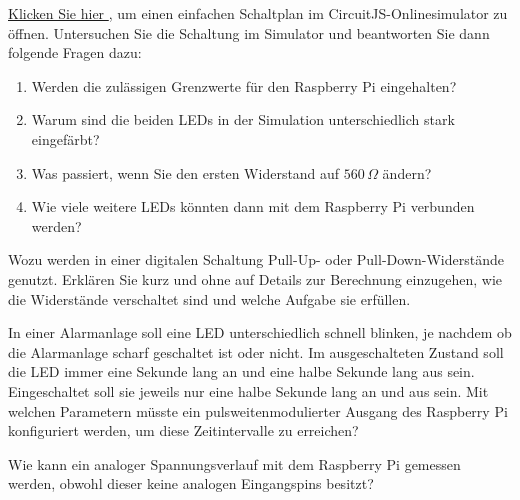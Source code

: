 \teilaufgabe
\textcolor{red}{
    \href{%
        https://www.falstad.com/circuit/circuitjs.html?ctz=CQAgjCAMB0l3BWcMBMcUHYMGZIA4UA2ATmIxAUgoqoQFMBaMMAKAHMRCUAWCsFTjwoo8UKCwBOnDAO7dRGQqLmiqYSizBcQi5fJB5ss-QIAmdAGYBDAK4AbAC4M7dU+DFUYkVgBlpx0S5eFTEIazsAZzoQbGhscT9CGRi8XiCU3jUQcKiYuPEpJIFsVJ0lDLE8MGJoUjr6+pZsDCpDYtLifgqITyaWgyMQEM6A916AdxARiumQyBZJ2f1phC75rQFdCraKs0tbR2dXMY9YVkWu1YF0q4T-GLRBXiNPdxzo2Pj5wuSXstE-moNJMtn8doC+q1Bn9pn8euILsVHrDSvMAEacBCEECYJDcDDEChY8QADyGigoeFo3GxCEMQ3AAgASlYIgAHNF0CQATwAOhEAAoASxYZMoAKECGIz0wDK6AHEBQBJADyDAAgjYImwrAA7NiimiiVZpSACVbkXhdACyrKi-IAFPKJAB7Gy60wASkNlHIJVpxHiJUJVoEitVGq1Ov1PsgltWFEDQwQwUZIHDas12r1BoxO0wAkDxoQ5HmZNStDwSE6leUafldAAtnQIlFdXRDYZCYRINjOt3ICG0wBlByuxsRBwAE4kAGs6LqWEA
    }{
        Klicken Sie hier%
    }%
}, um einen einfachen Schaltplan im CircuitJS-Onlinesimulator zu öffnen.
Untersuchen Sie die Schaltung im Simulator und beantworten Sie dann folgende Fragen
dazu:

\begin{enumerate}
    \item Werden die zulässigen Grenzwerte für den Raspberry Pi eingehalten?
    \item Warum sind die beiden LEDs in der Simulation unterschiedlich stark eingefärbt?
    \item Was passiert, wenn Sie den ersten Widerstand auf $560\,\Omega$ ändern?
    \item Wie viele weitere LEDs könnten dann mit dem Raspberry Pi verbunden werden?
\end{enumerate}

\bigskip
\teilaufgabe
Wozu werden in einer digitalen Schaltung Pull-Up- oder Pull-Down-Widerstände
genutzt. Erklären Sie kurz und ohne auf Details zur Berechnung einzugehen, wie
die Widerstände verschaltet sind und welche Aufgabe sie erfüllen.

\bigskip
\teilaufgabe
In einer Alarmanlage soll eine LED unterschiedlich schnell blinken, je nachdem
ob die Alarmanlage scharf geschaltet ist oder nicht. Im ausgeschalteten Zustand
soll die LED immer eine Sekunde lang an und eine halbe Sekunde lang aus sein.
Eingeschaltet soll sie jeweils nur eine halbe Sekunde lang an und aus sein.
Mit welchen Parametern müsste ein pulsweitenmodulierter Ausgang des Raspberry
Pi konfiguriert werden, um diese Zeitintervalle zu erreichen?

\bigskip
\teilaufgabe
Wie kann ein analoger Spannungsverlauf mit dem Raspberry Pi gemessen werden,
obwohl dieser keine analogen Eingangspins besitzt?

